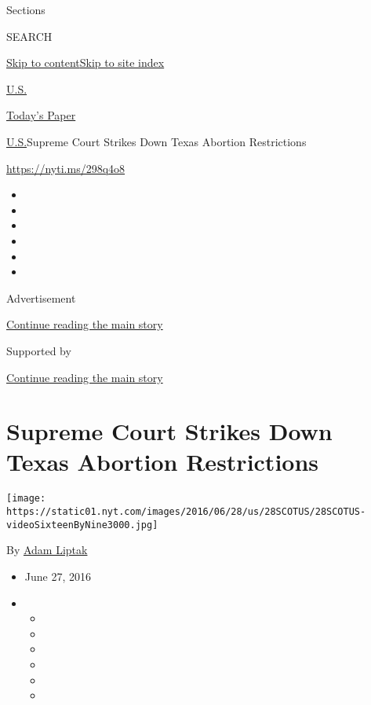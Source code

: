 Sections

SEARCH

\protect\hyperlink{site-content}{Skip to
content}\protect\hyperlink{site-index}{Skip to site index}

\href{https://www.nytimes.com/section/us}{U.S.}

\href{https://myaccount.nytimes.com/auth/login?response_type=cookie\&client_id=vi}{}

\href{https://www.nytimes.com/section/todayspaper}{Today's Paper}

\href{/section/us}{U.S.}\textbar{}Supreme Court Strikes Down Texas
Abortion Restrictions

\url{https://nyti.ms/298q4o8}

\begin{itemize}
\item
\item
\item
\item
\item
\item
\end{itemize}

Advertisement

\protect\hyperlink{after-top}{Continue reading the main story}

Supported by

\protect\hyperlink{after-sponsor}{Continue reading the main story}

\hypertarget{supreme-court-strikes-down-texas-abortion-restrictions}{%
\section{Supreme Court Strikes Down Texas Abortion
Restrictions}\label{supreme-court-strikes-down-texas-abortion-restrictions}}

\texttt{[image: https://static01.nyt.com/images/2016/06/28/us/28SCOTUS/28SCOTUS-videoSixteenByNine3000.jpg]}

By \href{http://www.nytimes.com/by/adam-liptak}{Adam Liptak}

\begin{itemize}
\item
  June 27, 2016
\item
  \begin{itemize}
  \item
  \item
  \item
  \item
  \item
  \item
  \end{itemize}
\end{itemize}

